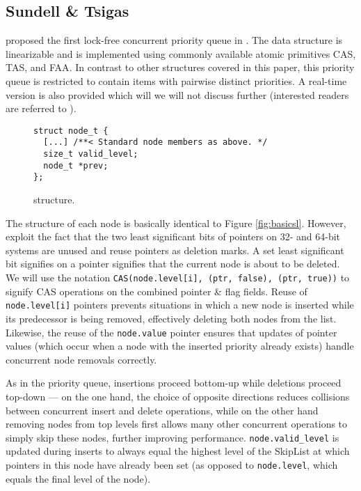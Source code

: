 \documentclass[a4paper,10pt]{article}
\begin{document}
\subsection{Sundell \& Tsigas} \label{sec:sundell}

\citeauthor{sundell2003fast} proposed the first lock-free concurrent priority queue in
\citeyear{sundell2003fast} \cite{sundell2003fast}. The data structure is linearizable
and is implemented using commonly available atomic primitives \ac{CAS}, \ac{TAS}, and \ac{FAA}.
In contrast to other structures covered in this paper, this priority queue is restricted to
contain items with pairwise distinct priorities.
A real-time version is also provided which will we will not discuss further (interested readers are
referred to \cite{sundell2003fast}).

\begin{figure}[h]
\begin{lstlisting}
struct node_t {
  [...] /**< Standard node members as above. */
  size_t valid_level;
  node_t *prev;
};
\end{lstlisting}
\caption{\citeauthor{sundell2003fast} structure.}
\label{fig:sundellsl}
\end{figure}

The structure of each node is basically identical to Figure \ref{fig:basicsl}. However, \citeauthor{sundell2003fast}
exploit the fact that the two least significant bits of pointers on 32- and 64-bit systems
are unused and reuse pointers as deletion marks. A set least significant bit signifies on a pointer signifies
that the current node is about to be deleted. We will use the notation 
\lstinline|CAS(node.level[i], (ptr, false), (ptr, true))| to signify \ac{CAS} operations on the
combined pointer \& flag fields.
Reuse of \lstinline|node.level[i]| pointers
prevents situations in which a new node is inserted while its predecessor is being removed,
effectively deleting both nodes from the list. Likewise, the reuse of the \lstinline|node.value|
pointer ensures that updates of pointer values (which occur when a node with the inserted priority already exists)
handle concurrent node removals correctly.

As in the \citeauthor{shavit2000skiplist} priority queue, insertions proceed bottom-up while
deletions proceed top-down --- on the one hand, the choice of opposite directions reduces collisions
between concurrent insert and delete operations, while on the other hand removing nodes from top levels first
allows many other concurrent operations to simply skip these nodes, further improving performance.
\lstinline|node.valid_level| is updated during inserts to always equal the highest level of the SkipList
at which pointers in this node have already been set (as opposed to \lstinline|node.level|, which equals
the final level of the node).
\end{document}
